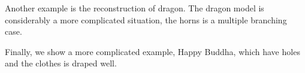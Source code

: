 \documentclass[3p,times]{elsarticle}
\begin{document}
Another example is the reconstruction of dragon. The dragon model is
considerably a more complicated situation, the horns is a multiple
branching case.

Finally, we show a more complicated example, Happy Buddha, which have
holes and the clothes is draped well.



\clearpage








\end{document}
